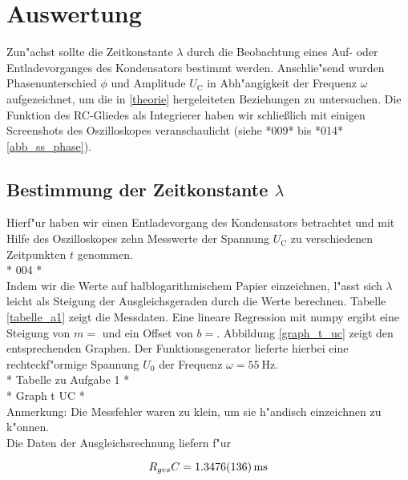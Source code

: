 \documentclass{scrartcl}
\begin{document}
	\section{Auswertung}

		Zun"achst sollte die Zeitkonstante $\lambda$ durch die Beobachtung eines Auf- oder Ent\-lade\-vor\-ganges des Kondensators bestimmt werden.
		Anschlie"send wurden Phasenunterschied $\phi$ und Amplitude $U_{\mathrm{C}}$ in Abh"angigkeit der Frequenz $\omega$ aufgezeichnet, um die in \ref{theorie} hergeleiteten Beziehungen zu untersuchen.
		Die Funktion des RC-Gliedes als Integrierer haben wir schließlich mit einigen Screenshots des Oszilloskopes veranschaulicht (siehe *009* bis *014*\ref{abb_ss_phase}).

		\subsection{Bestimmung der Zeitkonstante $\lambda$}

			Hierf"ur haben wir einen Entladevorgang des Kondensators betrachtet und mit Hilfe des Oszilloskopes
			zehn Messwerte der Spannung $U_{\mathrm{C}}$ zu verschiedenen Zeitpunkten $t$ genommen.\\

			* 004 *\\

			Indem wir die Werte auf halblogarithmischem Papier einzeichnen, l"asst sich $\lambda$ leicht als Steigung der Ausgleichsgeraden durch die Werte berechnen.
			Tabelle \ref{tabelle_a1} zeigt die Messdaten.
			Eine lineare Regression mit numpy ergibt eine Steigung von $m = $ und ein Offset von $b = $.
			Abbildung \ref{graph_t_uc} zeigt den entsprechenden Graphen. Der Funktionsgenerator lieferte hierbei eine rechteckf"ormige Spannung $U_0$ der Frequenz $\omega = \SI{55}{\hertz}$.\\

			* Tabelle zu Aufgabe 1 * \\

			* Graph t UC * \\

			Anmerkung: Die Messfehler waren zu klein, um sie h"andisch einzeichnen zu k"onnen.\\

			Die Daten der Ausgleichsrechnung liefern f"ur

			\begin{displaymath}
				R_{ges}C = \SI{1.3476 (136)}{\milli\second}
			\end{displaymath}
\end{document}

